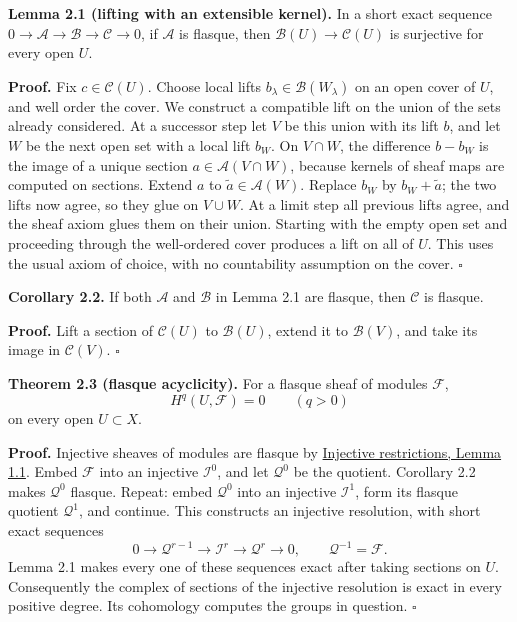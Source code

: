 \documentclass[11pt]{article}
\begin{document}
\textbf{Lemma 2.1 (lifting with an extensible kernel).} In a short exact
sequence \(0\to\mathcal A\to\mathcal B\to\mathcal C\to0\), if
\(\mathcal A\) is flasque, then \(\mathcal B(U)\to\mathcal C(U)\) is
surjective for every open \(U\).

\textbf{Proof.} Fix \(c\in\mathcal C(U)\). Choose local lifts
\(b_\lambda\in\mathcal B(W_\lambda)\) on an open cover of \(U\), and
well order the cover. We construct a compatible lift on the union of the
sets already considered. At a successor step let \(V\) be this union
with its lift \(b\), and let \(W\) be the next open set with a local
lift \(b_W\). On \(V\cap W\), the difference \(b-b_W\) is the image of a
unique section \(a\in\mathcal A(V\cap W)\), because kernels of sheaf
maps are computed on sections. Extend \(a\) to
\(\widetilde a\in\mathcal A(W)\). Replace \(b_W\) by
\(b_W+\widetilde a\); the two lifts now agree, so they glue on
\(V\cup W\). At a limit step all previous lifts agree, and the sheaf
axiom glues them on their union. Starting with the empty open set and
proceeding through the well-ordered cover produces a lift on all of
\(U\). This uses the usual axiom of choice, with no countability
assumption on the cover. \(\square\)

\textbf{Corollary 2.2.} If both \(\mathcal A\) and \(\mathcal B\) in
Lemma 2.1 are flasque, then \(\mathcal C\) is flasque.

\textbf{Proof.} Lift a section of \(\mathcal C(U)\) to
\(\mathcal B(U)\), extend it to \(\mathcal B(V)\), and take its image in
\(\mathcal C(V)\). \(\square\)

\textbf{Theorem 2.3 (flasque acyclicity).} For a flasque sheaf of
modules \(\mathcal F\), \[
H^q(U,\mathcal F)=0\qquad(q>0)
\] on every open \(U\subset X\).

\textbf{Proof.} Injective sheaves of modules are flasque by
\href{../derived-categories-and-sheaf-operations/injective-modules-and-bounded-below-derived-functors.html\#1-extending-maps-and-extending-sections}{Injective
restrictions, Lemma 1.1}. Embed \(\mathcal F\) into an injective
\(\mathcal I^0\), and let \(\mathcal Q^0\) be the quotient. Corollary
2.2 makes \(\mathcal Q^0\) flasque. Repeat: embed \(\mathcal Q^0\) into
an injective \(\mathcal I^1\), form its flasque quotient
\(\mathcal Q^1\), and continue. This constructs an injective resolution,
with short exact sequences \[
0\to\mathcal Q^{r-1}\to\mathcal I^r\to\mathcal Q^r\to0,
\qquad\mathcal Q^{-1}=\mathcal F.
\] Lemma 2.1 makes every one of these sequences exact after taking
sections on \(U\). Consequently the complex of sections of the injective
resolution is exact in every positive degree. Its cohomology computes
the groups in question. \(\square\)
\end{document}
